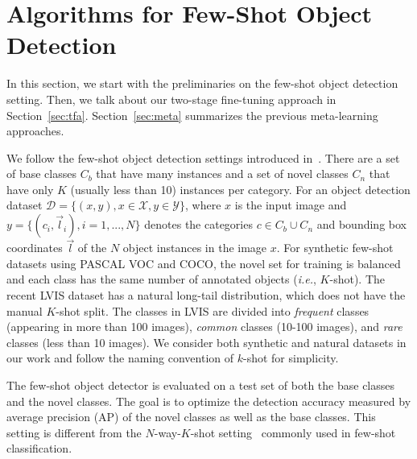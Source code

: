 \vspace{-0.3cm}
\section{Algorithms for Few-Shot Object Detection}

In this section, we start with the preliminaries on the few-shot object detection setting. Then, we talk about our two-stage fine-tuning approach in
Section~\ref{sec:tfa}. Section~\ref{sec:meta} summarizes the previous meta-learning approaches.

We follow the few-shot object detection settings introduced in~\citet{kang2019few}. There are a set of base
classes $C_b$ that have many instances and a set of novel classes $C_n$ that
have only $K$ (usually less than 10) instances per category.
For an object detection dataset $\mathcal{D}=\{(x, y), x\in\mathcal{X}, y\in\mathcal{Y}\}$, where $x$
is the input image and $y=\{(c_i, \vec{l}_i), i=1, ...,N\}$ denotes the categories $c \in C_b \cup C_n$
and bounding box coordinates $\vec{l}$ of the $N$ object instances in the image $x$.
For synthetic few-shot datasets using
PASCAL VOC and COCO, the novel set for training is balanced and each class has the same number of 
annotated objects (\textit{i.e.}, $K$-shot). The recent LVIS dataset has a natural long-tail distribution, which does
not have the manual $K$-shot split. The classes in LVIS are divided into \emph{frequent} classes
(appearing in more than 100 images), \emph{common} classes (10-100 images), and \emph{rare}
classes (less than 10 images). We consider both synthetic and natural datasets in our work and
follow the naming convention of $k$-shot for simplicity. 

The few-shot object detector is evaluated on a test set of both the base classes and
the novel classes. The goal is to optimize the detection accuracy measured by average precision (AP)
of the novel classes as well as the base classes. This setting is different from the $N$-way-$K$-shot setting~\cite{finn2017model,vinyals2016matching,snell2017prototypical}
commonly used in few-shot classification. 

